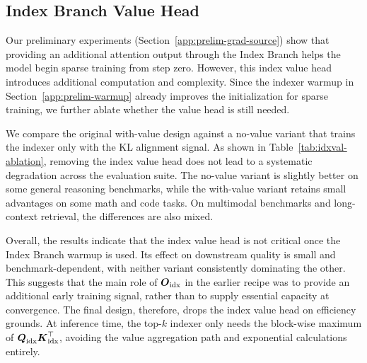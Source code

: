\documentclass{llmxive}
\providecommand{\bm}[1]{\boldsymbol{#1}}
\providecommand{\Secref}[1]{Section~\ref{#1}}
\providecommand{\mK}{{\bm{K}}}
\providecommand{\mO}{{\bm{O}}}
\providecommand{\mQ}{{\bm{Q}}}
\begin{document}
\subsection{Index Branch Value Head}
\label{app:from-scratch-no-idx-value}

Our preliminary experiments (\Secref{app:prelim-grad-source}) show that providing an additional attention output through the Index Branch helps the model begin sparse training from step zero. However, this index value head introduces additional computation and complexity. Since the indexer warmup in \Secref{app:prelim-warmup} already improves the initialization for sparse training, we further ablate whether the value head is still needed.

We compare the original with-value design against a no-value variant that trains the indexer only with the KL alignment signal. As shown in Table~\ref{tab:idxval-ablation}, removing the index value head does not lead to a systematic degradation across the evaluation suite. The no-value variant is slightly better on some general reasoning benchmarks, while the with-value variant retains small advantages on some math and code tasks. On multimodal benchmarks and long-context retrieval, the differences are also mixed.

Overall, the results indicate that the index value head is not critical once the Index Branch warmup is used. Its effect on downstream quality is small and benchmark-dependent, with neither variant consistently dominating the other.
This suggests that the main role of $\mO_{\rm idx}$ in the earlier recipe was to provide an additional early training signal, rather than to supply essential capacity at convergence.
The final design, therefore, drops the index value head on efficiency grounds. At inference time, the top-$k$ indexer only needs the block-wise maximum of $\mQ_{\rm idx}\mK_{\rm idx}^{\top}$, avoiding the value aggregation path and exponential calculations entirely.
\end{document}
